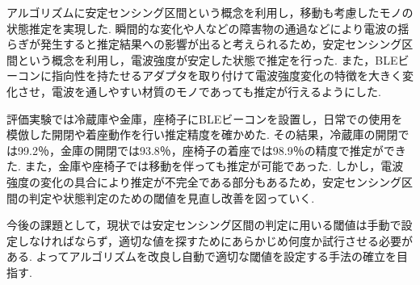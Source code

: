 \documentclass[Japanese]{dicomopapers}
\begin{document}
アルゴリズムに安定センシング区間という概念を利用し，移動も考慮したモノの状態推定を実現した.
瞬間的な変化や人などの障害物の通過などにより電波の揺らぎが発生すると推定結果への影響が出ると考えられるため，安定センシング区間という概念を利用し，電波強度が安定した状態で推定を行った.
また，BLEビーコンに指向性を持たせるアダプタを取り付けて電波強度変化の特徴を大きく変化させ，電波を通しやすい材質のモノであっても推定が行えるようにした.

評価実験では冷蔵庫や金庫，座椅子にBLEビーコンを設置し，日常での使用を模倣した開閉や着座動作を行い推定精度を確かめた.
その結果，冷蔵庫の開閉では99.2％，金庫の開閉では93.8％，座椅子の着座では98.9％の精度で推定ができた.
また，金庫や座椅子では移動を伴っても推定が可能であった.
しかし，電波強度の変化の具合により推定が不完全である部分もあるため，安定センシング区間の判定や状態判定のための閾値を見直し改善を図っていく.

今後の課題として，現状では安定センシング区間の判定に用いる閾値は手動で設定しなければならず，適切な値を探すためにあらかじめ何度か試行させる必要がある.
よってアルゴリズムを改良し自動で適切な閾値を設定する手法の確立を目指す.


\end{document}
